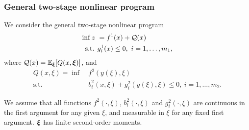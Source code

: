 \documentclass[aspectratio=169]{beamer}
\begin{document}
\begin{frame}
\frametitle{General two-stage nonlinear program}

We consider the general {\blue two-stage nonlinear program}
\begin{align*}
\inf z\ &= f^1(x) + {\mathcal{Q}}(x) \\
\mbox{s.t. } & g_i^1(x) \leq 0,\ i = 1,\ldots,m_1,
\end{align*}
where ${\mathcal{Q}}(x) = {\mathbb{E}}_{{\boldsymbol{\xi}}}[Q(x,{\boldsymbol{\xi}})]$, and
\begin{align*}
Q(x,\xi) = \inf\ & f^2(y(\xi),\xi) \\
\mbox{s.t. } & b_i^2(x,\xi) + g_i^2(y(\xi), \xi) \leq 0,\ i = 1,\ldots,m_2.
\end{align*}

We assume that all functions $f^2(\cdot,\xi)$, $b_i^2(\cdot,\xi)$ and $g_i^2(\cdot,\xi)$ are continuous in the first argument for any given $\xi$, and measurable in $\xi$ for any fixed first argument. ${\boldsymbol{\xi}}$ has finite second-order moments.

\end{frame}



\end{document}
